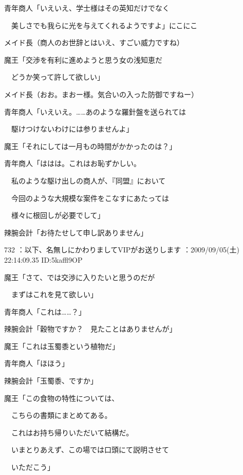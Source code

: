 \documentclass[a4j,twocolumn]{tarticle}
\begin{document}
青年商人「いえいえ、学士様はその英知だけでなく\par{} 
　美しさでも我らに光を与えてくれるようですよ」にこにこ 



メイド長（商人のお世辞とはいえ、すごい威力ですね） 



魔王「交渉を有利に進めようと思う女の浅知恵だ\par{} 
　どうか笑って許して欲しい」 



メイド長（おお。まおー様。気合いの入った防御ですねー） 



青年商人「いえいえ。……あのような羅針盤を送られては\par{} 
　駆けつけないわけには参りませんよ」 



魔王「それにしては一月もの時間がかかったのは？」 



青年商人「ははは。これはお恥ずかしい。\par{} 
　私のような駆け出しの商人が、『同盟』において\par{} 
　今回のような大規模な案件をこなすにあたっては\par{} 
　様々に根回しが必要でして」 



辣腕会計「お待たせして申し訳ありません」

	
    
    

732 ：以下、名無しにかわりましてVIPがお送りします ：2009/09/05(土) 22:14:09.35 ID:5kaffl9OP 


魔王「さて、では交渉に入りたいと思うのだが\par{} 
　まずはこれを見て欲しい」 



青年商人「これは……？」\par{} 
辣腕会計「穀物ですか？　見たことはありませんが」 



魔王「これは玉蜀黍という植物だ」\par{} 
青年商人「ほほう」 \par{}
辣腕会計「玉蜀黍、ですか」 



魔王「この食物の特性については、\par{} 
　こちらの書類にまとめてある。\par{} 
　これはお持ち帰りいただいて結構だ。\par{} 
　いまとりあえず、この場では口頭にて説明させて\par{} 
　いただこう」 
\end{document}
